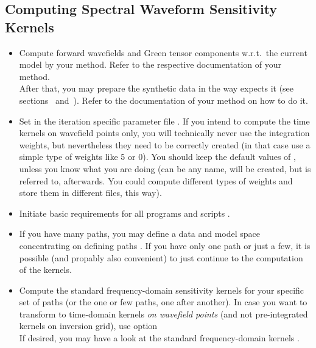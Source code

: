 \subsection*{Computing Spectral Waveform Sensitivity Kernels}
%
\begin{itemize}
\item Compute forward wavefields and Green tensor components w.r.t.\ the current model 
by your method. Refer to the respective documentation of your method.\\
After that, you may prepare the synthetic data in the way \ASKI expects it (see sections~ 
and~). Refer to the documentation of your method on how to do it.
%
\item Set  in the iteration specific parameter file 
. If you intend to compute the time kernels on wavefield points only, you will technically
never use the integration weights, but nevertheless they need to be correctly created (in that case use a simple
type of weights like 5 or 0).
You should keep the default values of ,
unless you know what you are doing (can be any name, will be created, but is referred to, afterwards. 
You could compute different types of weights and store them in different files, this way). 
%
\item Initiate basic requirements for all programs and scripts .
%
\item If you have many paths, you may define a data and model space concentrating on defining paths 
  .
  If you have only one path or just a few, it is possible (and propably also convenient) to just continue to the
  computation of the kernels.
%
\item Compute the standard frequency-domain sensitivity kernels for your specific set of paths (or the one or 
  few paths, one after another). In case you want to transform to time-domain kernels \emph{on wavefield points} 
  (and not pre-integrated kernels on inversion grid),
  use option   \\
  If desired, you may have a look at the standard frequency-domain kernels .
\end{itemize}
%
